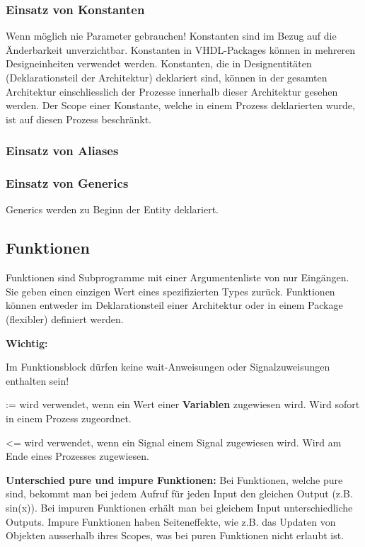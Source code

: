 \subsubsection{Einsatz von Konstanten}
Wenn möglich nie Parameter gebrauchen! Konstanten sind im Bezug auf die Änderbarkeit unverzichtbar. Konstanten in VHDL-Packages können in mehreren Designeinheiten verwendet werden. Konstanten, die in Designentitäten (Deklarationsteil der Architektur) deklariert sind, können in der gesamten Architektur einschliesslich der Prozesse innerhalb dieser Architektur gesehen werden. Der Scope einer Konstante, welche in einem Prozess deklarierten wurde, ist auf diesen Prozess beschränkt.

\subsubsection{Einsatz von Aliases}

\subsubsection{Einsatz von Generics}
Generics werden zu Beginn der Entity deklariert.


\subsection{Funktionen}
Funktionen sind Subprogramme mit einer Argumentenliste von nur Eingängen. Sie geben einen einzigen Wert eines spezifizierten Types zurück. Funktionen können entweder im Deklarationsteil einer Architektur oder in einem Package (flexibler) definiert werden. 

\textbf{Wichtig:}
\begin{compactitem}
    \item Im Funktionsblock dürfen keine wait-Anweisungen oder Signalzuweisungen enthalten sein! 
    \item := wird verwendet, wenn ein Wert einer \textbf{Variablen} zugewiesen wird. Wird sofort in einem Prozess zugeordnet.
    \item \textless= wird verwendet, wenn ein Signal einem Signal zugewiesen wird. Wird am Ende eines Prozesses zugewiesen.
\end{compactitem}
\textbf{Unterschied pure und impure Funktionen:} Bei Funktionen, welche pure sind, bekommt man bei jedem Aufruf für jeden Input den gleichen Output (z.B. sin(x)). Bei impuren Funktionen erhält man bei gleichem Input unterschiedliche Outputs. Impure Funktionen haben Seiteneffekte, wie z.B. das Updaten von Objekten ausserhalb ihres Scopes, was bei puren Funktionen nicht erlaubt ist.


